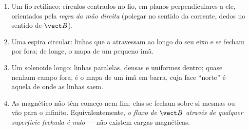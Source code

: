 \begin{proposition}\label{prop:b1:magnetostatics:maps}
\begin{enumerate}
  \item Um fio retilíneo: círculos centrados no fio, em planos
        perpendiculares a ele, orientados pela \emph{regra da mão direita}
        (polegar no sentido da corrente, dedos no sentido de $\vect B$).
  \item Uma espira circular: linhas que a atravessam ao longo do seu eixo e
        se fecham por fora; de longe, o mapa de um pequeno ímã.
  \item Um solenoide longo: linhas paralelas, densas e uniformes dentro; quase
        nenhum campo fora; é o mapa de um ímã em barra, cuja face ``norte''
        é aquela de onde as linhas saem.
  \item As  magnético não têm começo nem fim: elas se fecham
        sobre si mesmas ou vão para o infinito. Equivalentemente, \emph{o fluxo
        de $\vect B$ através de qualquer superfície fechada é nulo} --- não existem
        cargas magnéticas.
\end{enumerate}
\end{proposition}
\admitted


